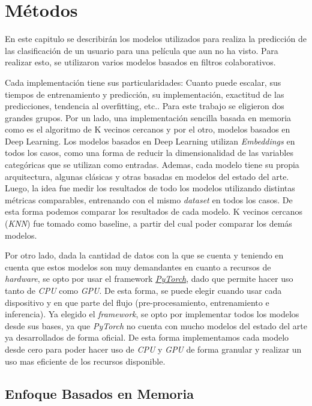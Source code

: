 \documentclass[11pt,a4paper,twoside]{thesis}
\begin{document}
\chapter{Métodos}

En este capitulo se describirán los modelos utilizados para realiza la predicción de las clasificación de un usuario para una película que aun no ha visto. Para realizar esto, se utilizaron varios modelos basados en filtros colaborativos. 

Cada implementación tiene sus particularidades:  Cuanto puede escalar, sus tiempos de entrenamiento y predicción, su implementación, exactitud de las predicciones, tendencia al overfitting, etc.. Para este trabajo se eligieron dos grandes grupos. Por un lado, una implementación sencilla basada en memoria como es el algoritmo de K vecinos cercanos y por el otro, modelos basados en Deep Learning. Los modelos basados en Deep Learning utilizan \textit{Embeddings} en todos los casos, como una forma de reducir la dimensionalidad de las variables categóricas que se utilizan como entradas. Ademas, cada modelo tiene su propia arquitectura, algunas clásicas y otras basadas en modelos del estado del arte. Luego, la idea fue medir los resultados de todo los modelos utilizando distintas métricas comparables, entrenando con el mismo \textit{dataset} en todos los casos. De esta forma podemos comparar los resultados de cada modelo. K vecinos cercanos (\textit{KNN}) fue tomado como baseline, a partir del cual poder comparar los demás modelos.

Por otro lado, dada la cantidad de datos con la que se cuenta y teniendo en cuenta que estos modelos son muy 
demandantes en cuanto a recursos de \textit{hardware}, se opto por usar el framework \href{https://pytorch.org/}{\textit{PyTorch}}, dado que permite hacer uso tanto de \textit{CPU} como \textit{GPU}. De esta forma, se puede elegir cuando usar cada dispositivo y en que parte del flujo (pre-procesamiento, entrenamiento e inferencia). Ya elegido el \textit{framework}, se opto por implementar todos los modelos desde sus bases, ya que \textit{PyTorch} no cuenta con mucho modelos del estado del arte ya desarrollados de forma oficial. De esta forma implementamos cada modelo desde cero para poder hacer uso de \textit{CPU} y \textit{GPU} de forma granular y realizar un uso mas eficiente de los recursos disponible.

\section{Enfoque Basados en Memoria}
\end{document}
